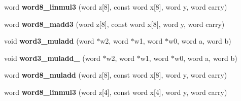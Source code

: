 \begin{DoxyCompactItemize}
\item 
\hypertarget{namespaceBotan_a5b52521e8eb536fa0c5818344a143f86}{word {\bfseries word8\-\_\-linmul3} (word z\mbox{[}8\mbox{]}, const word x\mbox{[}8\mbox{]}, word y, word carry)}\label{namespaceBotan_a5b52521e8eb536fa0c5818344a143f86}

\item 
\hypertarget{namespaceBotan_a05970f4cd10cae2e0d0404fec0a0422f}{word {\bfseries word8\-\_\-madd3} (word z\mbox{[}8\mbox{]}, const word x\mbox{[}8\mbox{]}, word y, word carry)}\label{namespaceBotan_a05970f4cd10cae2e0d0404fec0a0422f}

\item 
\hypertarget{namespaceBotan_a9b938b45c821ff0107f46ac1c67ea3ba}{void {\bfseries word3\-\_\-muladd} (word $\ast$w2, word $\ast$w1, word $\ast$w0, word a, word b)}\label{namespaceBotan_a9b938b45c821ff0107f46ac1c67ea3ba}

\item 
\hypertarget{namespaceBotan_aad4a2ff5a5988dc7a0dc5ef69ec66e10}{void {\bfseries word3\-\_\-muladd\-\_} (word $\ast$w2, word $\ast$w1, word $\ast$w0, word a, word b)}\label{namespaceBotan_aad4a2ff5a5988dc7a0dc5ef69ec66e10}

\item 
\hypertarget{namespaceBotan_a6738af24f72fd76d8491b852fe8f055c}{word {\bfseries word8\-\_\-muladd} (word z\mbox{[}8\mbox{]}, const word x\mbox{[}8\mbox{]}, word y, word carry)}\label{namespaceBotan_a6738af24f72fd76d8491b852fe8f055c}

\item 
\hypertarget{namespaceBotan_ac0d1772b55e7f66e7fcde98f377af06b}{word {\bfseries word8\-\_\-linmul3} (word z\mbox{[}4\mbox{]}, const word x\mbox{[}4\mbox{]}, word y, word carry)}\label{namespaceBotan_ac0d1772b55e7f66e7fcde98f377af06b}


\end{DoxyCompactItemize}
